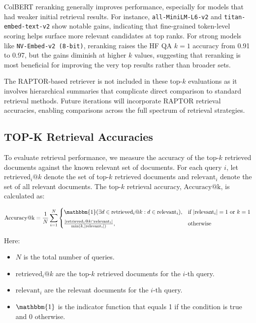 \documentclass{scrartcl}
\begin{document}
ColBERT reranking generally improves performance, especially for models that had weaker initial retrieval results. For instance, \texttt{all-MiniLM-L6-v2} and \texttt{titan-embed-text-v2} show notable gains, indicating that fine-grained token-level scoring helps surface more relevant candidates at top ranks. For strong models like \texttt{NV-Embed-v2 (8-bit)}, reranking raises the HF QA $k=1$ accuracy from 0.91 to 0.97, but the gains diminish at higher $k$ values, suggesting that reranking is most beneficial for improving the very top results rather than broader sets.

The RAPTOR-based retriever is not included in these top-$k$ evaluations as it involves hierarchical summaries that complicate direct comparison to standard retrieval methods. Future iterations will incorporate RAPTOR retrieval accuracies, enabling comparisons across the full spectrum of retrieval strategies.

\subsection{TOP-K Retrieval Accuracies}

To evaluate retrieval performance, we measure the accuracy of the top-\(k\) retrieved documents against the known relevant set of documents. For each query \(i\), let \(\text{retrieved}_i@k\) denote the set of top-\(k\) retrieved documents and \(\text{relevant}_i\) denote the set of all relevant documents. The top-\(k\) retrieval accuracy, \(\text{Accuracy@k}\), is calculated as:

\begin{equation}
\text{Accuracy@k} = \frac{1}{N} \sum_{i=1}^{N} 
    \begin{cases}
      \mathbbm{1}(\exists d \in \text{retrieved}_i@k : d \in \text{relevant}_i), & \text{if } |\text{relevant}_i| = 1 \text{ or } k = 1 \\[6pt]
      \frac{|\text{retrieved}_i@k \cap \text{relevant}_i|}{\min(k, |\text{relevant}_i|)}, & \text{otherwise}
    \end{cases}
\end{equation}

Here:
\begin{itemize}
    \item \(N\) is the total number of queries.
    \item \(\text{retrieved}_i@k\) are the top-\(k\) retrieved documents for the \(i\)-th query.
    \item \(\text{relevant}_i\) are the relevant documents for the \(i\)-th query.
    \item \(\mathbbm{1}\) is the indicator function that equals 1 if the condition is true and 0 otherwise.
\end{itemize}
\end{document}
